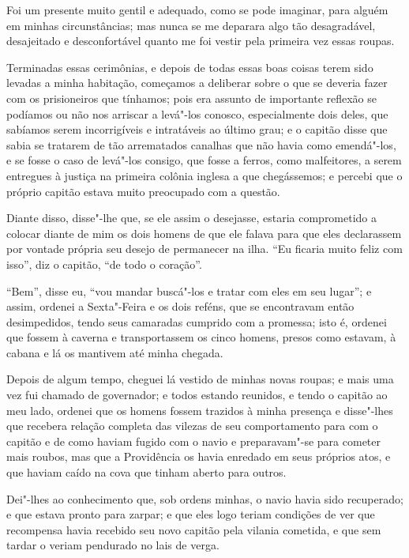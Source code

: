 Foi um presente muito gentil e adequado, como se pode imaginar, para
alguém em minhas circunstâncias; mas nunca se me deparara algo tão
desagradável, desajeitado e desconfortável quanto me foi vestir pela
primeira vez essas roupas.

Terminadas essas cerimônias, e depois de todas essas boas coisas terem
sido levadas a minha habitação, começamos a deliberar sobre o que se
deveria fazer com os prisioneiros que tínhamos; pois era assunto de
importante reflexão se podíamos ou não nos arriscar a levá"-los conosco,
especialmente dois deles, que sabíamos serem incorrigíveis e intratáveis
ao último grau; e o capitão disse que sabia se tratarem de tão
arrematados canalhas que não havia como emendá"-los, e se fosse o caso de
levá"-los consigo, que fosse a ferros, como malfeitores, a serem
entregues à justiça na primeira colônia inglesa a que chegássemos; e
percebi que o próprio capitão estava muito preocupado com a questão.

Diante disso, disse"-lhe que, se ele assim o desejasse, estaria
comprometido a colocar diante de mim os dois homens de que ele falava
para que eles declarassem por vontade própria seu desejo de permanecer
na ilha. ``Eu ficaria muito feliz com isso'', diz o capitão, ``de todo o
coração''.

``Bem'', disse eu, ``vou mandar buscá"-los e tratar com eles em seu
lugar''; e assim, ordenei a Sexta"-Feira e os dois reféns, que se
encontravam então desimpedidos, tendo seus camaradas cumprido com a
promessa; isto é, ordenei que fossem à caverna e transportassem os cinco
homens, presos como estavam, à cabana e lá os mantivem até minha
chegada.

Depois de algum tempo, cheguei lá vestido de minhas novas roupas; e mais
uma vez fui chamado de governador; e todos estando reunidos, e tendo o
capitão ao meu lado, ordenei que os homens fossem trazidos à minha
presença e disse"-lhes que recebera relação completa das vilezas de seu
comportamento para com o capitão e de como haviam fugido com o navio e
preparavam"-se para cometer mais roubos, mas que a Providência os havia
enredado em seus próprios atos, e que haviam caído na cova que tinham
aberto para outros.

Dei"-lhes ao conhecimento que, sob ordens minhas, o navio havia sido
recuperado; e que estava pronto para zarpar; e que eles logo teriam
condições de ver que recompensa havia recebido seu novo capitão pela
vilania cometida, e que sem tardar o veriam pendurado no lais de verga.

